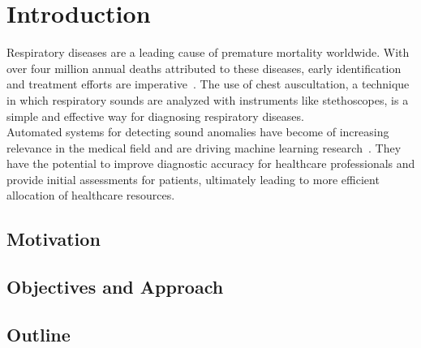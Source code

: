 \cleardoubleoddpage%
\chapter{Introduction}
Respiratory diseases are a leading cause of premature mortality worldwide. With over four million annual deaths attributed to these diseases, early identification and treatment efforts are imperative~\cite{ferkol2014global}. The use of chest auscultation, a technique in which respiratory sounds are analyzed with instruments like stethoscopes, is a simple and effective way for diagnosing respiratory diseases. \\
Automated systems for detecting sound anomalies have become of increasing relevance in the medical field and are driving machine learning research~\cite{bohadana2014fundamentals}. They have the potential to improve diagnostic accuracy for healthcare professionals and provide initial assessments for patients, ultimately leading to more efficient allocation of healthcare resources. 

\section{Motivation}



\section{Objectives and Approach}


\section{Outline}



